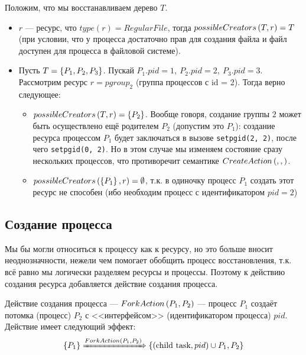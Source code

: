 \begin{exmp}
Положим, что мы восстанавливаем дерево $T$.
\begin{itemize}
	\item $r$ --- ресурс, что $type(r) = RegularFile$, тогда $possibleCreators\left( T, r \right) = T$ (при условии, что у процесса достаточно прав для создания файла и файл доступен для процесса в файловой системе).

	\item Пусть $T = \left\lbrace P_1, P_2, P_3 \right\rbrace$. Пускай $P_1.pid = 1,\ P_2.pid = 2,\ P_3.pid = 3$. Рассмотрим ресурс $r = pgroup_2$ (группа процессов с id = 2). Тогда верно следующее:
	\begin{itemize}
		\item $possibleCreators\left( T, r \right) = \left\lbrace P_2 \right\rbrace$. Вообще говоря, создание группы $2$ может быть осуществлено ещё родителем $P_2$ (допустим это $P_1$): создание ресурса процессом $P_1$ будет заключаться в вызове \texttt{setpgid(2, 2)}, после чего \texttt{setpgid(0, 2)}. Но в этом случае мы изменяем состояние сразу нескольких процессов, что противоречит семантике $CreateAction\left( , ,  \right)$.
		\item $possibleCreators\left( \left\lbrace P_1 \right\rbrace, r \right) = \emptyset$, т.к. в одиночку процесс $P_1$ создать этот ресурс не способен (ибо необходим процесс с идентификатором $pid = 2$)
	\end{itemize}
\end{itemize}
\end{exmp}


\subsection{Создание процесса}

Мы бы могли относиться к процессу как к ресурсу, но это больше вносит неоднозначности, нежели чем помогает обобщить процесс восстановления, т.к. всё равно мы логически разделяем ресурсы и процессы. Поэтому к действию создания ресурса добавляется действие создания процесса.

\begin{defn}
\label{def:forkact}
Действие создания процесса --- $ForkAction\left( P_1, P_2 \right)$ --- процесс $P_1$ создаёт потомка (процесс) $P_2$ с <<интерфейсом>> (идентификатором процесса) $pid$. Действие имеет следующий эффект:
\begin{equation*}
	\left\lbrace P_1 \right\rbrace \xRightarrow{ForkAction\left( P_1, P_2 \right)} \left\lbrace (\text{child task}, pid) \cup P_1, P_2 \right\rbrace
\end{equation*}
\end{defn}

